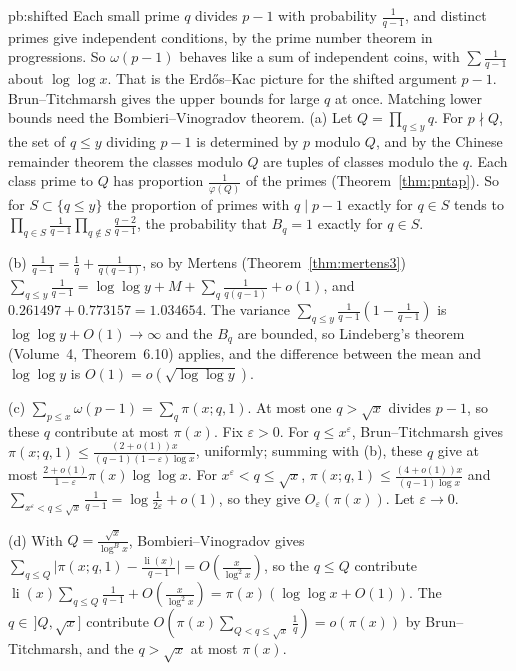\begin{solution}{pb:shifted}
\idea Each small prime $q$ divides $p-1$ with probability $\frac1{q-1}$, and distinct primes give independent conditions, by the prime number theorem in progressions. So $\omega(p-1)$ behaves like a sum of independent coins, with $\sum\frac1{q-1}$ about $\log\log x$. That is the Erd\H os--Kac picture for the shifted argument $p-1$. Brun--Titchmarsh gives the upper bounds for large $q$ at once. Matching lower bounds need the Bombieri--Vinogradov theorem.
\writeup (a) Let $Q=\prod_{q\le y}q$. For $p\nmid Q$, the set of $q\le y$ dividing $p-1$ is determined by $p$ modulo $Q$, and by the Chinese remainder theorem the classes modulo $Q$ are
tuples of classes modulo the $q$. Each class prime to $Q$ has proportion $\frac1{\varphi(Q)}$ of the primes (Theorem~\ref{thm:pntap}). So for $S\subset\{q\le y\}$ the proportion of primes with
$q\mid p-1$ exactly for $q\in S$ tends to $\prod_{q\in S}\frac1{q-1}\prod_{q\notin S}\frac{q-2}{q-1}$, the probability that $B_q=1$ exactly for $q\in S$.

(b) $\frac1{q-1}=\frac1q+\frac1{q(q-1)}$, so by Mertens (Theorem~\ref{thm:mertens3}) $\sum_{q\le y}\frac1{q-1}=\log\log y+M+\sum_q\frac1{q(q-1)}+o(1)$, and
$0.261497+0.773157=1.034654$. The variance $\sum_{q\le y}\frac1{q-1}(1-\frac1{q-1})$ is $\log\log y+O(1)\to\infty$ and the $B_q$ are bounded, so Lindeberg's theorem (Volume~4,
Theorem~6.10) applies, and the difference between the mean and $\log\log y$ is $O(1)=o(\sqrt{\log\log y})$.

(c) $\sum_{p\le x}\omega(p-1)=\sum_q\pi(x;q,1)$. At most one $q>\sqrt x$ divides $p-1$, so these $q$ contribute at most $\pi(x)$. Fix $\varepsilon>0$. For $q\le x^\varepsilon$,
Brun--Titchmarsh gives $\pi(x;q,1)\le\frac{(2+o(1))x}{(q-1)(1-\varepsilon)\log x}$, uniformly; summing with (b), these $q$ give at most $\frac{2+o(1)}{1-\varepsilon}\pi(x)\log\log x$. For
$x^\varepsilon<q\le\sqrt x$, $\pi(x;q,1)\le\frac{(4+o(1))x}{(q-1)\log x}$ and $\sum_{x^\varepsilon<q\le\sqrt x}\frac1{q-1}=\log\frac1{2\varepsilon}+o(1)$, so they give $O_\varepsilon(\pi(x))$. Let $\varepsilon\to0$.

(d) With $Q=\frac{\sqrt x}{\log^Bx}$, Bombieri--Vinogradov gives $\sum_{q\le Q}\bigl|\pi(x;q,1)-\frac{\operatorname{li}(x)}{q-1}\bigr|=O(\frac x{\log^2x})$, so the $q\le Q$ contribute
$\operatorname{li}(x)\sum_{q\le Q}\frac1{q-1}+O(\frac x{\log^2x})=\pi(x)(\log\log x+O(1))$. The $q\in\,]Q,\sqrt x]$ contribute $O(\pi(x)\sum_{Q<q\le\sqrt x}\frac1q)=o(\pi(x))$ by Brun--Titchmarsh, and the
$q>\sqrt x$ at most $\pi(x)$.


\end{solution}
